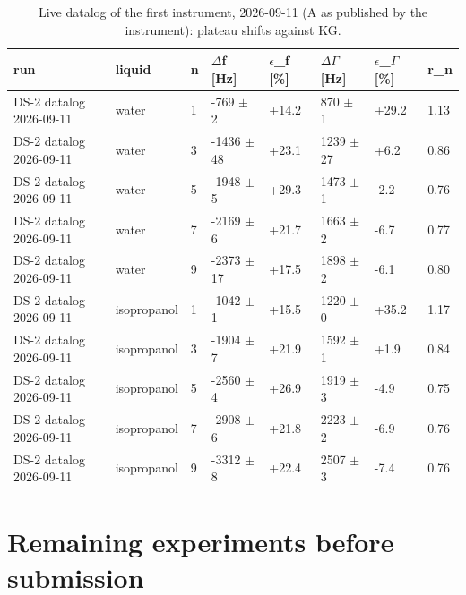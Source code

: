 \documentclass[11pt,a4paper]{article}
\begin{document}
\begin{landscape}{\scriptsize\setlength{\tabcolsep}{2pt}
\begin{longtable}{@{}llllllll@{}}
\caption{Live datalog of the first instrument, 2026-09-11 (A as published by the instrument): plateau shifts against KG.}\\
\toprule
run & liquid & n & $\Delta$f [Hz] & $\epsilon$\_f [\%] & $\Delta$$\Gamma$ [Hz] & $\epsilon$\_$\Gamma$ [\%] & r\_n \\\midrule\endhead
DS-2 datalog 2026-09-11 & water & 1 & -769 $\pm$ 2 & +14.2 & 870 $\pm$ 1 & +29.2 & 1.13 \\
DS-2 datalog 2026-09-11 & water & 3 & -1436 $\pm$ 48 & +23.1 & 1239 $\pm$ 27 & +6.2 & 0.86 \\
DS-2 datalog 2026-09-11 & water & 5 & -1948 $\pm$ 5 & +29.3 & 1473 $\pm$ 1 & -2.2 & 0.76 \\
DS-2 datalog 2026-09-11 & water & 7 & -2169 $\pm$ 6 & +21.7 & 1663 $\pm$ 2 & -6.7 & 0.77 \\
DS-2 datalog 2026-09-11 & water & 9 & -2373 $\pm$ 17 & +17.5 & 1898 $\pm$ 2 & -6.1 & 0.80 \\
DS-2 datalog 2026-09-11 & isopropanol & 1 & -1042 $\pm$ 1 & +15.5 & 1220 $\pm$ 0 & +35.2 & 1.17 \\
DS-2 datalog 2026-09-11 & isopropanol & 3 & -1904 $\pm$ 7 & +21.9 & 1592 $\pm$ 1 & +1.9 & 0.84 \\
DS-2 datalog 2026-09-11 & isopropanol & 5 & -2560 $\pm$ 4 & +26.9 & 1919 $\pm$ 3 & -4.9 & 0.75 \\
DS-2 datalog 2026-09-11 & isopropanol & 7 & -2908 $\pm$ 6 & +21.8 & 2223 $\pm$ 2 & -6.9 & 0.76 \\
DS-2 datalog 2026-09-11 & isopropanol & 9 & -3312 $\pm$ 8 & +22.4 & 2507 $\pm$ 3 & -7.4 & 0.76 \\
\bottomrule
\end{longtable}}\end{landscape}

\section{Remaining experiments before submission}
\end{document}
